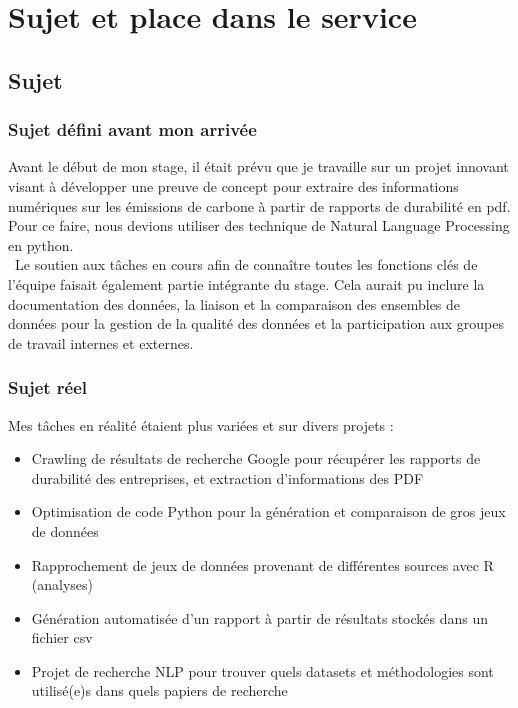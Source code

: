 \section{Sujet et place dans le service}
\subsection{Sujet}
\subsubsection{Sujet défini avant mon arrivée}

Avant le début de mon stage, il était prévu que je travaille sur un projet innovant visant à développer une preuve de concept pour extraire des informations numériques sur les émissions de carbone à partir de rapports de durabilité en pdf. 
Pour ce faire, nous devions utiliser des technique de Natural Language Processing en python.\\

~Le soutien aux tâches en cours afin de connaître toutes les fonctions clés de l'équipe faisait également partie intégrante du stage. 
Cela aurait pu inclure la documentation des données, la liaison et la comparaison des ensembles de données pour la gestion de la qualité des données et la participation aux groupes de travail internes et externes.


\subsubsection{Sujet réel}

Mes tâches en réalité étaient plus variées et sur divers projets :
\begin{itemize}
    \item Crawling de résultats de recherche Google pour récupérer les rapports de durabilité des entreprises, et extraction d'informations des PDF
    \item Optimisation de code Python pour la génération et comparaison de gros jeux de données
    \item Rapprochement de jeux de données provenant de différentes sources avec R (analyses)
    \item Génération automatisée d'un rapport à partir de résultats stockés dans un fichier csv
    \item Projet de recherche NLP pour trouver quels datasets et méthodologies sont utilisé(e)s dans quels papiers de recherche
\end{itemize}


